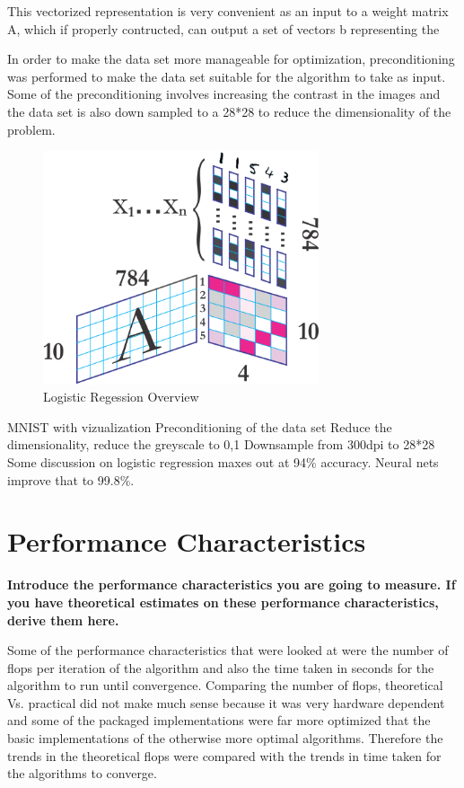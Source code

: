 \documentclass[10pt,twocolumn]{article}
\begin{document}
This vectorized representation is very convenient as an input to a weight matrix A, which if properly contructed, can output a set of vectors b representing the 


In order to make the data set more manageable for optimization, preconditioning was performed to make the data set suitable for the algorithm to take as input. Some of the preconditioning involves increasing the contrast in the images and  the data set is also down sampled to a 28*28 to reduce the dimensionality of the problem. 







\begin{figure}
\includegraphics[width=3.2in]{./mnist-logistic.png}
\caption{Logistic Regession Overview}
\end{figure}


MNIST with vizualization
Preconditioning of the data set
Reduce the dimensionality, reduce the greyscale to 0,1
Downsample from 300dpi to 28*28
Some discussion on logistic regression maxes out at 94\% accuracy. Neural nets improve that to 99.8\%. 


\section{Performance Characteristics}

\textbf{Introduce the performance characteristics you are going to measure. If you have theoretical estimates on these performance characteristics, derive them here.}

Some of the performance characteristics that were looked at were the number of flops per iteration of the algorithm and also the time taken in seconds for the algorithm to run until convergence. Comparing the number of flops, theoretical Vs. practical did not make much sense because it was very hardware dependent and some of the packaged implementations were far more optimized that the basic implementations of the otherwise more optimal algorithms. Therefore the trends in the theoretical flops were compared with the trends in time taken for the algorithms to converge. 
\end{document}
